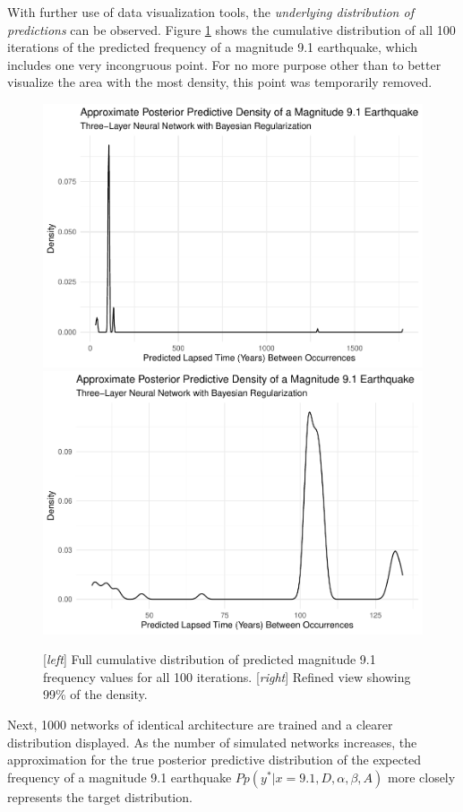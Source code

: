 With further use of data visualization tools, the \textit{underlying distribution of predictions} can be observed.  Figure \ref{tohoku_ppd_100} shows the cumulative distribution of all 100 iterations of the predicted frequency of a magnitude 9.1 earthquake, which includes one very incongruous point.  For no more purpose other than to better visualize the area with the most density, this point was temporarily removed.
\begin{figure}[H]
    \includegraphics[width=0.5\linewidth]{earthquakes_files/figure-latex/unnamed-chunk-12-3.pdf}
    \includegraphics[width=0.5\linewidth]{earthquakes_files/figure-latex/unnamed-chunk-14-2.pdf}
    \caption{\footnotesize{[\textit{left}] Full cumulative distribution of predicted magnitude 9.1 frequency values for all 100 iterations. [\textit{right}] Refined view showing 99\% of the density.}}
    \label{tohoku_ppd_100}
\end{figure}
Next, 1000 networks of identical architecture are trained and a clearer distribution displayed.  As the number of simulated networks increases, the approximation for the true posterior predictive distribution of the expected frequency of a magnitude 9.1 earthquake
$Pp(y^*|x=9.1,D,\alpha,\beta,A)$
more closely represents the target distribution.


